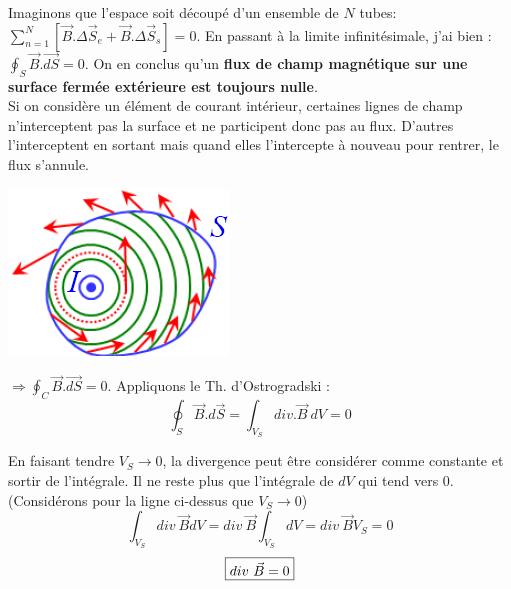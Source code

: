 \documentclass	[11pt, a4paper, openany]{book}
\begin{document}
Imaginons que l'espace soit découpé d'un ensemble de $N$ tubes: $\sum_{n=1}^N [\vec{B}.\Delta\vec{S}_e + \vec{B}.\Delta\vec{S}_s] = 0$. En passant à la limite infinitésimale, j'ai bien : $\oint_S \vec{B}.\vec{dS} = 0$. On en conclus qu'un \textbf{flux de champ magnétique sur une surface fermée extérieure est toujours nulle}.\\

Si on considère un élément de courant intérieur, certaines lignes de champ n'interceptent pas la surface et ne participent donc pas au flux. D'autres l'interceptent en sortant mais quand elles l'intercepte à nouveau pour rentrer, le flux s'annule.
\begin{center}
	\includegraphics[scale=0.60]{magneto/image21.png}\\
\end{center}
$\Rightarrow \oint_C \vec{B}.\vec{dS} = 0$. Appliquons le Th. d'Ostrogradski :
\begin{equation}
	\oint_S \vec{B}.d\vec{S} = \int_{V_S} div.\vec{B}\ dV = 0
\end{equation}

En faisant tendre $V_S \rightarrow 0$, la divergence peut être considérer comme constante et sortir de l'intégrale. Il ne reste plus que l'intégrale de $dV$ qui tend vers 0. (Considérons pour la ligne ci-dessus que $V_S \rightarrow 0$)
\begin{equation}
	\int_{V_S} div\ \vec{B}dV = div\ \vec{B}\int_{V_S} dV = div\ \vec{B} V_S = 0
\end{equation}
\begin{equation}
	\fbox{$div\ \vec{B} = 0 $}
\end{equation}
\\
\end{document}
